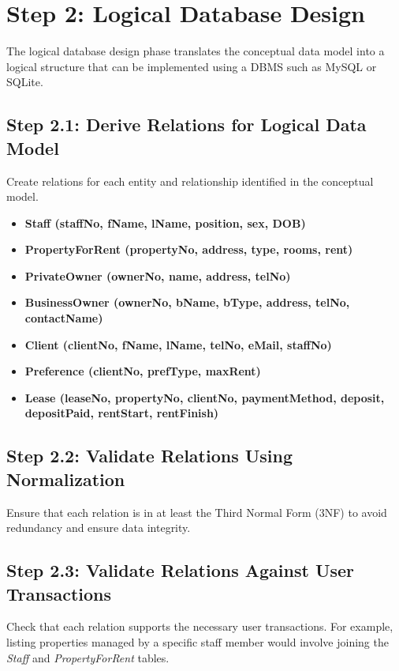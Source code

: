 \documentclass[a4paper,12pt]{article}
\begin{document}
\newpage

\section*{Step 2: Logical Database Design}

The logical database design phase translates the conceptual data model into a logical structure that can be implemented using a DBMS such as MySQL or SQLite.

\subsection*{Step 2.1: Derive Relations for Logical Data Model}
Create relations for each entity and relationship identified in the conceptual model.

\begin{itemize}
    \item \textbf{Staff (staffNo, fName, lName, position, sex, DOB)}
    \item \textbf{PropertyForRent (propertyNo, address, type, rooms, rent)}
    \item \textbf{PrivateOwner (ownerNo, name, address, telNo)}
    \item \textbf{BusinessOwner (ownerNo, bName, bType, address, telNo, contactName)}
    \item \textbf{Client (clientNo, fName, lName, telNo, eMail, staffNo)}
    \item \textbf{Preference (clientNo, prefType, maxRent)}
    \item \textbf{Lease (leaseNo, propertyNo, clientNo, paymentMethod, deposit, depositPaid, rentStart, rentFinish)}
\end{itemize}

\subsection*{Step 2.2: Validate Relations Using Normalization}
Ensure that each relation is in at least the Third Normal Form (3NF) to avoid redundancy and ensure data integrity.

\subsection*{Step 2.3: Validate Relations Against User Transactions}
Check that each relation supports the necessary user transactions. For example, listing properties managed by a specific staff member would involve joining the \textit{Staff} and \textit{PropertyForRent} tables.
\end{document}

